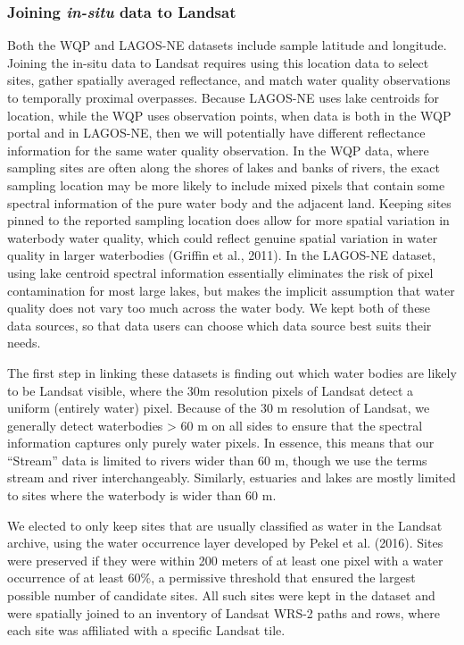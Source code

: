 \documentclass[]{article}
\begin{document}
\hypertarget{joining-in-situ-data-to-landsat}{%
\subsubsection{\texorpdfstring{Joining \emph{in-situ} data to
Landsat}{Joining in-situ data to Landsat}}\label{joining-in-situ-data-to-landsat}}

Both the WQP and LAGOS-NE datasets include sample latitude and
longitude. Joining the in-situ data to Landsat requires using this
location data to select sites, gather spatially averaged reflectance,
and match water quality observations to temporally proximal overpasses.
Because LAGOS-NE uses lake centroids for location, while the WQP uses
observation points, when data is both in the WQP portal and in LAGOS-NE,
then we will potentially have different reflectance information for the
same water quality observation. In the WQP data, where sampling sites
are often along the shores of lakes and banks of rivers, the exact
sampling location may be more likely to include mixed pixels that
contain some spectral information of the pure water body and the
adjacent land. Keeping sites pinned to the reported sampling location
does allow for more spatial variation in waterbody water quality, which
could reflect genuine spatial variation in water quality in larger
waterbodies (Griffin et al., 2011). In the LAGOS-NE dataset, using lake
centroid spectral information essentially eliminates the risk of pixel
contamination for most large lakes, but makes the implicit assumption
that water quality does not vary too much across the water body. We kept
both of these data sources, so that data users can choose which data
source best suits their needs.

The first step in linking these datasets is finding out which water
bodies are likely to be Landsat visible, where the 30m resolution pixels
of Landsat detect a uniform (entirely water) pixel. Because of the 30 m
resolution of Landsat, we generally detect waterbodies \textgreater{} 60
m on all sides to ensure that the spectral information captures only
purely water pixels. In essence, this means that our ``Stream'' data is
limited to rivers wider than 60 m, though we use the terms stream and
river interchangeably. Similarly, estuaries and lakes are mostly limited
to sites where the waterbody is wider than 60 m.

We elected to only keep sites that are usually classified as water in
the Landsat archive, using the water occurrence layer developed by Pekel
et al. (2016). Sites were preserved if they were within 200 meters of at
least one pixel with a water occurrence of at least 60\%, a permissive
threshold that ensured the largest possible number of candidate sites.
All such sites were kept in the dataset and were spatially joined to an
inventory of Landsat WRS-2 paths and rows, where each site was
affiliated with a specific Landsat tile.
\end{document}
